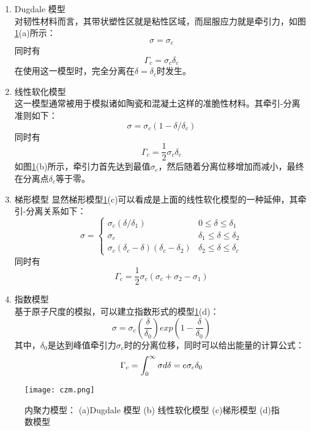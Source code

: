 \begin{enumerate}
	\item Dugdale 模型\\
	对韧性材料而言，其带状塑性区就是粘性区域，而屈服应力就是牵引力，如图\ref{fig:czm}(a)所示：
	\begin{equation}
	\sigma = \sigma_c
	\end{equation}
	同时有
	\begin{equation}
	\Gamma_c = \sigma_c\delta_c
	\end{equation}
	在使用这一模型时，完全分离在$\delta = \delta_c$时发生。
	\item 线性软化模型\\
	这一模型通常被用于模拟诸如陶瓷和混凝土这样的准脆性材料。其牵引-分离准则如下：
	\begin{equation}
	\sigma = \sigma_c(1-\delta/\delta_c)
	\end{equation}
	同时有
	\begin{equation}
	\Gamma_c = \frac{1}{2} \sigma_c \delta_c
	\end{equation}
	如图\ref{fig:czm}(b)所示，牵引力首先达到最值$\sigma_c$，然后随着分离位移增加而减小，最终在分离点$\delta_c$等于零。
	\item 梯形模型
	显然梯形模型\ref{fig:czm}(c)可以看成是上面的线性软化模型的一种延伸，其牵引-分离关系如下：
	\begin{equation}
	\sigma = 
	\begin{cases}
	\sigma_c(\delta/\delta_1)&\text{$0 \leq 
	\delta \leq \delta_1$}\\
	\sigma_c&\text{$\delta_1 \leq \delta \leq \delta_2$}\\
	\sigma_c(\delta_c-\delta)(\delta_c-\delta_2)&\text{$\delta_2 \leq \delta \leq \delta_c$}
	\end{cases}
	\end{equation}
	同时有
	\begin{equation}
	\Gamma_c = \frac{1}{2} \sigma_c (\sigma_c + \sigma_2 - \sigma_1)
	\end{equation}
	\item 指数模型\\
	基于原子尺度的模拟\cite{Rose1981Universal}，可以建立指数形式的模型\ref{fig:czm}(d)：
	\begin{equation}
	\sigma = \sigma_c \left(\frac{\delta}{\delta_0}\right)exp\left(1-\frac{\delta}{\delta_0}\right)
	\end{equation}
	其中，$\delta_0$是达到峰值牵引力$\sigma_c$时的分离位移，同时可以给出能量的计算公式：
	\begin{equation}
	\Gamma_c = \int^{\infty}_0 \sigma d\delta = \mathnormal{e} \sigma_c \delta_0
	\end{equation}
\end{enumerate}
\begin{figure}
\centering   
\texttt{[image: czm.png]}
\caption{内聚力模型： (a)Dugdale 模型 (b) 线性软化模型 (c)梯形模型 (d)指数模型} 
\label{fig:czm}
\end{figure}
